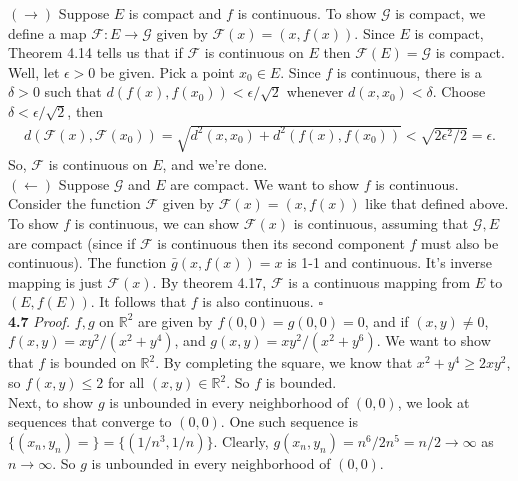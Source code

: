\documentclass[11pt]{article}
\begin{document}
\noindent $(\rightarrow)$ Suppose $E$ is compact and $f$ is continuous. To show $\mathcal{G}$ is compact, we define a map $\mathcal{F} : E \to \mathcal{G}$ given by $\mathcal{F}(x) = (x,f(x))$. Since $E$ is compact, Theorem 4.14 tells us that if $\mathcal{F}$ is continuous on $E$ then $\mathcal{F}(E) = \mathcal{G}$ is compact. Well, let $\epsilon > 0$ be given. Pick a point $x_0 \in E$. Since $f$ is continuous, there is a $\delta > 0$ such that $d(f(x),f(x_0)) < \epsilon/\sqrt{2}$ whenever $d(x,x_0) < \delta$. Choose $\delta < \epsilon/\sqrt{2}$, then 
\begin{align}
d(\mathcal{F}(x), \mathcal{F}(x_0)) = \sqrt{d^2(x,x_0) + d^2(f(x),f(x_0))} < \sqrt{2\epsilon^2/2} = \epsilon.
\end{align}
So, $\mathcal{F}$ is continuous on $E$, and we're done. \\




\noindent $(\leftarrow)$  Suppose $\mathcal{G}$ and $E$ are compact. We want to show $f$ is continuous. Consider the function $\mathcal{F}$ given by $\mathcal{F}(x) = (x,f(x))$ like that defined above. To show $f$ is continuous, we can show $\mathcal{F}(x)$ is continuous, assuming that $\mathcal{G}, E$ are compact (since if $\mathcal{F}$ is continuous then its second component $f$ must also be continuous). The function $\bar{g}(x,f(x)) = x$ is 1-1 and continuous. It's inverse mapping is just $\mathcal{F}(x)$. By theorem 4.17, $\mathcal{F}$ is a continuous mapping from $E$ to $(E,f(E))$. It follows that $f$ is also continuous. \hfill $\square$\\








\noindent \textbf{4.7}   
\noindent \textit{Proof.} $f,g$ on $\mathbb{R}^2$ are given by $f(0,0) = g(0,0) = 0$, and if $(x,y)\neq 0$, $f(x,y) = xy^2/(x^2 + y^4)$, and $g(x,y) = xy^2/(x^2 + y^6)$. We want to show that $f$ is bounded on $\mathbb{R}^2$. By completing the square, we know that $x^2 + y^4 \geq 2xy^2 $, so $f(x,y) \leq 2$ for all $(x,y) \in \mathbb{R}^2$. So $f$ is bounded.\\


Next, to show $g$ is unbounded in every neighborhood of $(0,0)$, we look at sequences that converge to $(0,0)$. One such sequence is $\{ (x_n,y_n) =  \}  = \{ (1/n^3,1/n) \}$. Clearly, $g(x_n,y_n) = n^6/2n^5 = n/2 \to \infty$ as $n\to \infty$. So $g$ is unbounded in every neighborhood of $(0,0)$. \\
\end{document}
